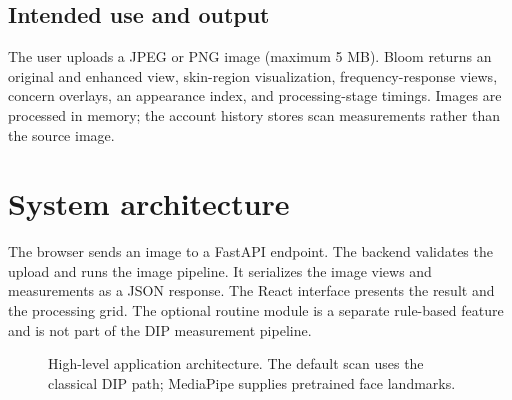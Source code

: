 \documentclass[11pt,a4paper]{article}
\begin{document}
\subsection{Intended use and output}
The user uploads a JPEG or PNG image (maximum 5 MB). Bloom returns an original and enhanced view, skin-region visualization, frequency-response views, concern overlays, an appearance index, and processing-stage timings. Images are processed in memory; the account history stores scan measurements rather than the source image.

\section{System architecture}

The browser sends an image to a FastAPI endpoint. The backend validates the upload and runs the image pipeline. It serializes the image views and measurements as a JSON response. The React interface presents the result and the processing grid. The optional routine module is a separate rule-based feature and is not part of the DIP measurement pipeline.

\begin{figure}[ht]
\centering
{}
\caption{High-level application architecture. The default scan uses the classical DIP path; MediaPipe supplies pretrained face landmarks.}
\label{fig:architecture}
\end{figure}
\end{document}
